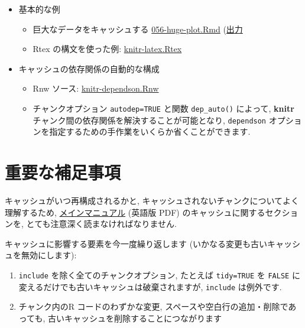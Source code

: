 \documentclass[
  xelatex,ja=standard,jafont=noto]{bxjsreport}
\providecommand{\tightlist}{%
  \setlength{\itemsep}{0pt}\setlength{\parskip}{0pt}}
\begin{document}
\begin{itemize}
\tightlist
\item
  基本的な例

  \begin{itemize}
  \tightlist
  \item
    巨大なデータをキャッシュする
    \href{https://github.com/yihui/knitr-examples/raw/master/056-huge-plot.Rmd}{056-huge-plot.Rmd}
    (\href{https://github.com/yihui/knitr-examples/blob/master/056-huge-plot.md}{出力}
  \item
    Rtex の構文を使った例:
    \href{https://github.com/yihui/knitr/blob/master/inst/examples/knitr-latex.Rtex}{knitr-latex.Rtex}
  \end{itemize}
\item
  キャッシュの依存関係の自動的な構成

  \begin{itemize}
  \tightlist
  \item
    Rnw ソース:
    \href{https://github.com/yihui/knitr-examples/blob/master/017-auto-dependson.Rnw}{knitr-dependson.Rnw}
  \item
    チャンクオプション \texttt{autodep=TRUE} と関数 \texttt{dep\_auto()}
    によって, \textbf{knitr}
    チャンク間の依存関係を解決することが可能となり, \texttt{dependson}
    オプションを指定するための手作業をいくらか省くことができます.
  \end{itemize}
\end{itemize}

\hypertarget{ux91cdux8981ux306aux88dcux8db3ux4e8bux9805}{%
\section*{重要な補足事項}\label{ux91cdux8981ux306aux88dcux8db3ux4e8bux9805}}

キャッシュがいつ再構成されるかと,
キャッシュされないチャンクについてよく理解するため,
\href{https://github.com/yihui/knitr/releases/download/doc/knitr-manual.pdf}{メインマニュアル}
(英語版 PDF) のキャッシュに関するセクションを,
とても注意深く読まなければなりません.

キャッシュに影響する要素を今一度繰り返します
(いかなる変更も古いキャッシュを無効にします):

\begin{enumerate}
\def\labelenumi{\arabic{enumi}.}
\tightlist
\item
  \texttt{include} を除く全てのチャンクオプション, たとえば
  \texttt{tidy=TRUE} を \texttt{FALSE}
  に変えるだけでも古いキャッシュは破棄されますが, \texttt{include}
  は例外です.
\item
  チャンク内のR コードのわずかな変更,
  スペースや空白行の追加・削除であっても,
  古いキャッシュを削除することにつながります
\end{enumerate}
\end{document}
